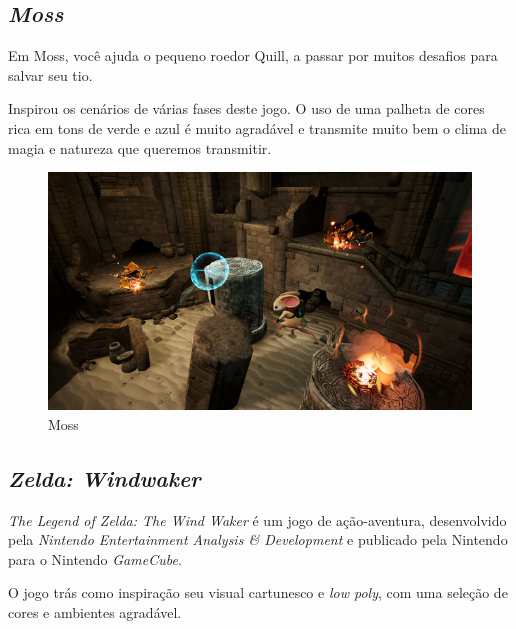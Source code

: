 \clearpage

\subsection{\textit{Moss}}
Em Moss, você ajuda o pequeno roedor Quill, a passar por muitos desafios para salvar seu tio. \cite{Moss18}

Inspirou os cenários de várias fases deste jogo. O uso de uma palheta de cores rica em tons de verde e azul é muito agradável e transmite muito bem o clima de magia e natureza que queremos transmitir. 

\begin{figure}[!htb] \caption{\label{fig_moss}Moss} \begin{center}
\includegraphics[width=\textwidth]{imagens/moss.jpg} \end{center}
 \end{figure}

\clearpage

\subsection{\textit{Zelda: Windwaker}}
\textit{The Legend of Zelda: The Wind Waker} é um jogo de ação-aventura, desenvolvido pela \textit{Nintendo Entertainment Analysis \& Development} e publicado pela Nintendo para o Nintendo \textit{GameCube}.

O jogo trás como inspiração seu visual cartunesco e \textit{low poly}, com uma seleção de cores e ambientes agradável.

